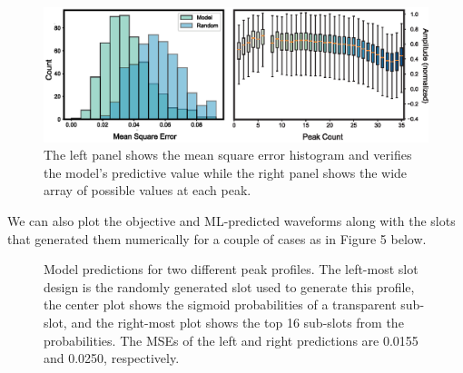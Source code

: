 \documentclass[11pt]{article}
\begin{document}
\begin{figure}[H]
	\includegraphics[width=6.5in]{figures/fig6a.eps}
		\caption{The left panel shows the mean square error histogram and verifies the model's predictive value while the right panel shows the wide array of possible values at each peak.}
\end{figure}

\noindent We can also plot the objective and ML-predicted waveforms along with the slots that generated them numerically for a couple of cases as in Figure 5 below.


\begin{figure}[H]
	\centering
	\caption{Model predictions for two different peak profiles. The left-most slot design is the randomly generated slot used to generate this profile, the center plot shows the sigmoid probabilities of a transparent sub-slot, and the right-most plot shows the top 16 sub-slots from the probabilities. The MSEs of the left and right predictions are 0.0155 and 0.0250, respectively.}
\end{figure}
\end{document}
